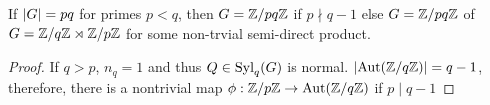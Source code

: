     \begin{theorem}
        If $|G|= pq$ for primes $p < q$, then $G = \mathbb{Z}/pq\mathbb{Z}$ if $p \nmid q - 1$ else $G = \mathbb{Z}/pq\mathbb{Z}$ of $G =  \mathbb{Z}/q\mathbb{Z} \rtimes \mathbb{Z}/p\mathbb{Z} $ for some non-trvial semi-direct product. 
    \end{theorem}

    \begin{proof}
        If $q > p$, $n_q = 1$ and thus $Q \in \text{Syl}_q(G)$ is normal. $|\text{Aut}(\mathbb{Z}/q\mathbb{Z})| = q - 1$, therefore, there is a nontrivial map $\phi: \mathbb{Z}/p\mathbb{Z}\to \text{Aut}(\mathbb{Z}/q\mathbb{Z})$ if $p \mid q - 1$  
    \end{proof}